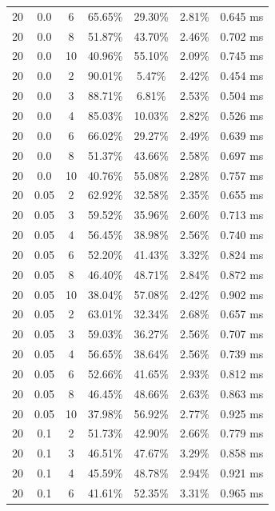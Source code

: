 \documentclass[11pt,a4paper]{article}
\begin{document}
\begin{longtable}{ccccccc}
        20 & 0.0 & 6 & 65.65\% & 29.30\% & 2.81\% & 0.645 ms \\
        20 & 0.0 & 8 & 51.87\% & 43.70\% & 2.46\% & 0.702 ms \\
        20 & 0.0 & 10 & 40.96\% & 55.10\% & 2.09\% & 0.745 ms \\
        20 & 0.0 & 2 & 90.01\% & 5.47\% & 2.42\% & 0.454 ms \\
        20 & 0.0 & 3 & 88.71\% & 6.81\% & 2.53\% & 0.504 ms \\
        20 & 0.0 & 4 & 85.03\% & 10.03\% & 2.82\% & 0.526 ms \\
        20 & 0.0 & 6 & 66.02\% & 29.27\% & 2.49\% & 0.639 ms \\
        20 & 0.0 & 8 & 51.37\% & 43.66\% & 2.58\% & 0.697 ms \\
        20 & 0.0 & 10 & 40.76\% & 55.08\% & 2.28\% & 0.757 ms \\
        \midrule
        20 & 0.05 & 2 & 62.92\% & 32.58\% & 2.35\% & 0.655 ms \\
        20 & 0.05 & 3 & 59.52\% & 35.96\% & 2.60\% & 0.713 ms \\
        20 & 0.05 & 4 & 56.45\% & 38.98\% & 2.56\% & 0.740 ms \\
        20 & 0.05 & 6 & 52.20\% & 41.43\% & 3.32\% & 0.824 ms \\
        20 & 0.05 & 8 & 46.40\% & 48.71\% & 2.84\% & 0.872 ms \\
        20 & 0.05 & 10 & 38.04\% & 57.08\% & 2.42\% & 0.902 ms \\
        20 & 0.05 & 2 & 63.01\% & 32.34\% & 2.68\% & 0.657 ms \\
        20 & 0.05 & 3 & 59.03\% & 36.27\% & 2.56\% & 0.707 ms \\
        20 & 0.05 & 4 & 56.65\% & 38.64\% & 2.56\% & 0.739 ms \\
        20 & 0.05 & 6 & 52.66\% & 41.65\% & 2.93\% & 0.812 ms \\
        20 & 0.05 & 8 & 46.45\% & 48.66\% & 2.63\% & 0.863 ms \\
        20 & 0.05 & 10 & 37.98\% & 56.92\% & 2.77\% & 0.925 ms \\
        \midrule
        20 & 0.1 & 2 & 51.73\% & 42.90\% & 2.66\% & 0.779 ms \\
        20 & 0.1 & 3 & 46.51\% & 47.67\% & 3.29\% & 0.858 ms \\
        20 & 0.1 & 4 & 45.59\% & 48.78\% & 2.94\% & 0.921 ms \\
        20 & 0.1 & 6 & 41.61\% & 52.35\% & 3.31\% & 0.965 ms \\

\end{longtable}
\end{document}
